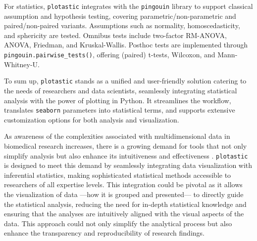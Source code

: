 For statistics, \texttt{plotastic} integrates with the \texttt{pingouin} library
to support classical assumption and hypothesis testing, covering
parametric/non-parametric and paired/non-paired variants. Assumptions such as
normality, homoscedasticity, and sphericity are tested. Omnibus tests include
two-factor RM-ANOVA, ANOVA, Friedman, and Kruskal-Wallis. Posthoc tests are
implemented through \texttt{pingouin.pairwise\_tests()}, offering (paired)
t-tests, Wilcoxon, and Mann-Whitney-U.

To sum up, \texttt{plotastic} stands as a unified and user-friendly solution
catering to the needs of researchers and data scientists, seamlessly
integrating statistical analysis with the power of plotting in Python.
It streamlines the workflow, translates \texttt{seaborn} parameters into
statistical terms, and supports extensive customization options for both
analysis and visualization.

\newpage




%
\label{sec:C2_discussion}%
As awareness of the complexities associated with multidimensional data in
biomedical research increases, there is a growing demand for tools that not only
simplify analysis but also enhance its intuitiveness and effectiveness
\cite{dunnExploringVisualizingMultidimensional2017}. \texttt{plotastic} is
designed to meet this demand by seamlessly integrating data visualization with
inferential statistics, making sophisticated statistical methods accessible to
researchers of all expertise levels. This integration could be pivotal as it
allows the visualization of data —how it is grouped and presented— to directly
guide the statistical analysis, reducing the need for in-depth statistical
knowledge and ensuring that the analyses are intuitively aligned with the visual
aspects of the data. This approach could not only simplify the analytical process
but also enhance the transparency and reproducibility of research findings.



